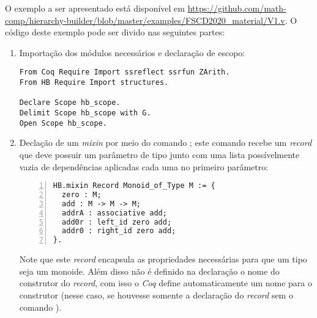 {{O exemplo a ser apresentado está disponível em \url{https://github.com/math-comp/hierarchy-builder/blob/master/examples/FSCD2020_material/V1.v}. O código deste exemplo pode ser divido nas seguintes partes:
    \begin{enumerate}
        \item Importação dos módulos necessários e declaração de escopo:
        \begin{lstlisting}[language=coq, frame=single, tabsize=1]
From Coq Require Import ssreflect ssrfun ZArith.
From HB Require Import structures.

Declare Scope hb_scope.
Delimit Scope hb_scope with G.
Open Scope hb_scope.
        \end{lstlisting}
    
        \item \label{item:mixin-monoid} Declação de um \textit{mixin} por meio do comando ; este comando recebe um \textit{record} que deve possuir um parâmetro de tipo  junto com uma lista possívelmente vazia de dependências 
        aplicadas cada uma no primeiro parâmetro:
            \begin{lstlisting}[language=coq, frame=single, tabsize=1, numbers=left]
HB.mixin Record Monoid_of_Type M := {
  zero : M;
  add : M -> M -> M;
  addrA : associative add;
  add0r : left_id zero add;
  addr0 : right_id zero add;
}.
            \end{lstlisting}
        Note que este \textit{record} encapsula as propriedades necessárias para que um tipo  seja um monoide. Além disso não é definido na declaração o nome do construtor do \textit{record}, com isso o \textit{Coq} define automaticamente um nome para o construtor (nesse caso, se houvesse somente a declaração do \textit{record} sem o comando  ).


\end{enumerate}}}
